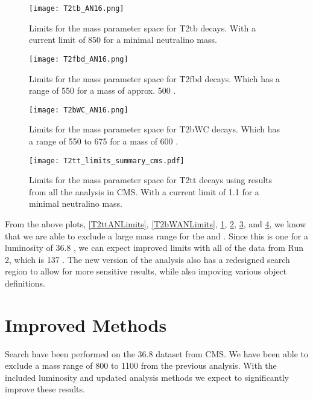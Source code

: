 \begin{figure}
\centering
	\texttt{[image: T2tb\_AN16.png]}
 	\caption[T2tb Limits]{Limits for the mass parameter space for T2tb decays. With a current limit of 850 \GeV{} for a minimal neutralino mass.}
 	\label{T2tbANLimits} 
\end{figure}

\begin{figure}
\centering
	\texttt{[image: T2fbd\_AN16.png]}
 	\caption[T2fbd Limits]{Limits for the mass parameter space for T2fbd decays. Which has a range of 550 \GeV{} for a \neutralino{} mass of approx. 500 \GeV.}
 	\label{T2fbdANLimits} 
\end{figure}

\begin{figure}
\centering
	\texttt{[image: T2bWC\_AN16.png]}
 	\caption[T2bWC Limits]{Limits for the mass parameter space for T2bWC decays. Which has a range of 550 to 675 \GeV{} for a \neutralino{} mass of 600 \GeV.}
 	\label{T2bWCANLimits} 
\end{figure}

\begin{figure}
\centering
	\texttt{[image: T2tt\_limits\_summary\_cms.pdf]}
 	\caption[T2tt Limits for all decay modes]{Limits for the mass parameter space for T2tt decays using results from all the analysis in CMS. With a current limit of 1.1 \TeV{} for a minimal neutralino mass.}
 	\label{T2ttCMSAll} 
\end{figure}

From the above plots, \ref{T2ttANLimits}, \ref{T2bWANLimits}, \ref{T2tbANLimits}, \ref{T2fbdANLimits}, \ref{T2bWCANLimits}, and \ref{T2ttCMSAll}, we know that we are able to exclude a large mass range for the \st{} and \neutralino{}. Since this is one for a luminosity of 36.8 \fb, we can expect improved limits with all of the data from Run 2, which is 137 \fb. The new version of the analysis also has a redesigned search region to allow for more sensitive results, while also impoving various object definitions.

\section{Improved Methods}
Search have been performed on the 36.8 \fb{} dataset from CMS. We have been able to exclude a mass range of 800 to 1100 \GeV{} from the previous analysis. With the included luminosity and updated analysis methods we expect to significantly improve these results. 
